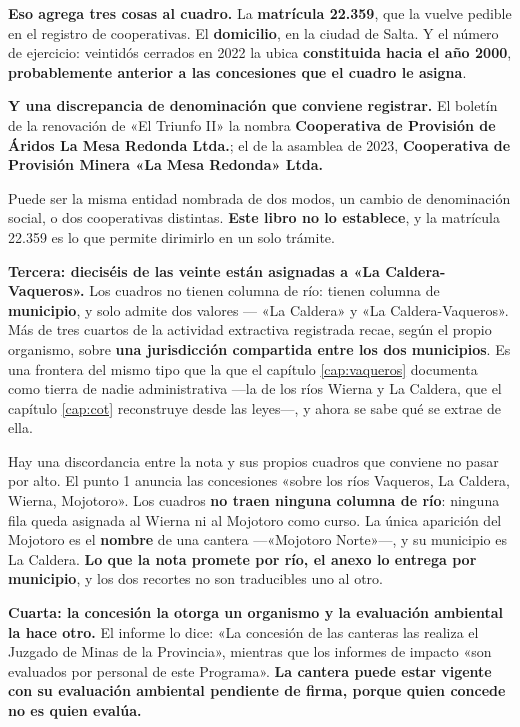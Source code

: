 \textbf{Eso agrega tres cosas al cuadro.} La \textbf{matrícula 22.359}, que la vuelve pedible en
el registro de cooperativas. El \textbf{domicilio}, en la ciudad de Salta. Y el número de
ejercicio: veintidós cerrados en 2022 la ubica \textbf{constituida hacia el año 2000},
\textbf{probablemente anterior a las concesiones que el cuadro le asigna}.

\begin{cautela}
\textbf{Y una discrepancia de denominación que conviene registrar.} El boletín de la renovación
de «El Triunfo II» la nombra \textbf{Cooperativa de Provisión de Áridos La Mesa Redonda Ltda.};
el de la asamblea de 2023, \textbf{Cooperativa de Provisión Minera «La Mesa Redonda» Ltda.}

Puede ser la misma entidad nombrada de dos modos, un cambio de denominación social, o dos
cooperativas distintas. \textbf{Este libro no lo establece}, y la matrícula 22.359 es lo que
permite dirimirlo en un solo trámite.
\end{cautela}

\textbf{Tercera: dieciséis de las veinte están asignadas a «La Caldera-Vaqueros».} Los cuadros
no tienen columna de río: tienen columna de \textbf{municipio}, y solo admite dos valores ---
«La Caldera» y «La Caldera-Vaqueros». Más de tres cuartos de la actividad extractiva registrada
recae, según el propio organismo, sobre \textbf{una jurisdicción compartida entre los dos
municipios}. Es una frontera del mismo tipo que la que el capítulo \ref{cap:vaqueros} documenta como tierra de nadie administrativa ---la de los ríos Wierna y La Caldera, que el capítulo \ref{cap:cot} reconstruye desde las leyes---, y ahora se sabe qué se extrae de ella.

\begin{cautela}
Hay una discordancia entre la nota y sus propios cuadros que conviene no pasar por alto. El
punto 1 anuncia las concesiones «sobre los ríos Vaqueros, La Caldera, Wierna, Mojotoro». Los
cuadros \textbf{no traen ninguna columna de río}: ninguna fila queda asignada al Wierna ni al
Mojotoro como curso. La única aparición del Mojotoro es el \textbf{nombre} de una cantera
---«Mojotoro Norte»---, y su municipio es La Caldera. \textbf{Lo que la nota promete por río,
el anexo lo entrega por municipio}, y los dos recortes no son traducibles uno al otro.
\end{cautela}

\textbf{Cuarta: la concesión la otorga un organismo y la evaluación ambiental la hace otro.}
El informe lo dice: «La concesión de las canteras las realiza el Juzgado de Minas de la
Provincia», mientras que los informes de impacto «son evaluados por personal de este
Programa». \textbf{La cantera puede estar vigente con su evaluación ambiental pendiente de
firma, porque quien concede no es quien evalúa.}


